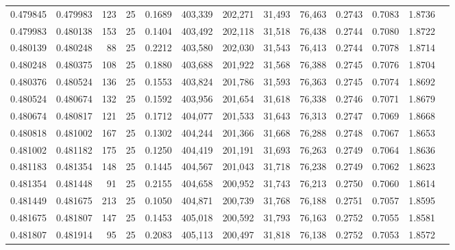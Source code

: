 \begin{tabular}{rrrrrrrrrrrrr}
0.479845 & 0.479983 &   123 &  25 &                                     0.1689 & 403,339 & 202,271 &  31,493 &  76,463 & 0.2743 & 0.7083 & 1.8736 \\
0.479983 & 0.480138 &   153 &  25 &                                     0.1404 & 403,492 & 202,118 &  31,518 &  76,438 & 0.2744 & 0.7080 & 1.8722 \\
0.480139 & 0.480248 &    88 &  25 &                                     0.2212 & 403,580 & 202,030 &  31,543 &  76,413 & 0.2744 & 0.7078 & 1.8714 \\
0.480248 & 0.480375 &   108 &  25 &                                     0.1880 & 403,688 & 201,922 &  31,568 &  76,388 & 0.2745 & 0.7076 & 1.8704 \\
0.480376 & 0.480524 &   136 &  25 &                                     0.1553 & 403,824 & 201,786 &  31,593 &  76,363 & 0.2745 & 0.7074 & 1.8692 \\
0.480524 & 0.480674 &   132 &  25 &                                     0.1592 & 403,956 & 201,654 &  31,618 &  76,338 & 0.2746 & 0.7071 & 1.8679 \\
0.480674 & 0.480817 &   121 &  25 &                                     0.1712 & 404,077 & 201,533 &  31,643 &  76,313 & 0.2747 & 0.7069 & 1.8668 \\
0.480818 & 0.481002 &   167 &  25 &                                     0.1302 & 404,244 & 201,366 &  31,668 &  76,288 & 0.2748 & 0.7067 & 1.8653 \\
0.481002 & 0.481182 &   175 &  25 &                                     0.1250 & 404,419 & 201,191 &  31,693 &  76,263 & 0.2749 & 0.7064 & 1.8636 \\
0.481183 & 0.481354 &   148 &  25 &                                     0.1445 & 404,567 & 201,043 &  31,718 &  76,238 & 0.2749 & 0.7062 & 1.8623 \\
0.481354 & 0.481448 &    91 &  25 &                                     0.2155 & 404,658 & 200,952 &  31,743 &  76,213 & 0.2750 & 0.7060 & 1.8614 \\
0.481449 & 0.481675 &   213 &  25 &                                     0.1050 & 404,871 & 200,739 &  31,768 &  76,188 & 0.2751 & 0.7057 & 1.8595 \\
0.481675 & 0.481807 &   147 &  25 &                                     0.1453 & 405,018 & 200,592 &  31,793 &  76,163 & 0.2752 & 0.7055 & 1.8581 \\
0.481807 & 0.481914 &    95 &  25 &                                     0.2083 & 405,113 & 200,497 &  31,818 &  76,138 & 0.2752 & 0.7053 & 1.8572 \\

\end{tabular}
